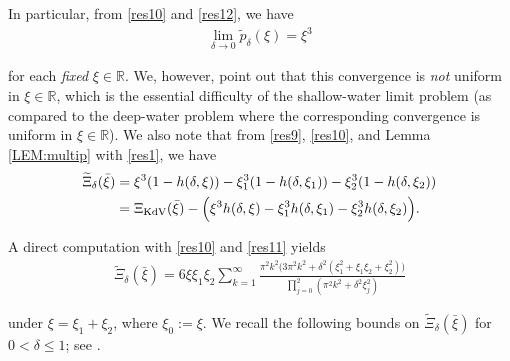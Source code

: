 \documentclass[letterpaper, 11pt,  reqno]{amsart}
\newcommand{\1}{\hspace{0.5mm}\textup{I}\hspace{0.5mm}}
\newcommand{\noi}{\noindent}
\newcommand{\R}{\mathbb{R}}
\newcommand{\dl}{\delta}
\newcommand{\wt}{\widetilde}
\newcommand{\KDV}{\text{\rm KdV} }
\numberwithin{equation}{section}
\numberwithin{theorem}{section}
\begin{document}
In particular, from \eqref{res10} and \eqref{res12}, 
we have
\begin{align}
\lim_{\dl \to 0}
\wt p_\dl(\xi) = \xi^3
\label{res13}
\end{align}

\noi
for each {\it fixed} $\xi \in \R$.
We, however, point out that this convergence
is {\it not} uniform in $\xi \in \R$, 
which is  
the essential difficulty of the shallow-water limit problem
(as compared to the deep-water problem
where the corresponding convergence is uniform in $\xi \in \R$).
We also note that 
from \eqref{res9}, \eqref{res10}, and Lemma \ref{LEM:multip}
with \eqref{res1}, we have
\begin{align}
\begin{split}
\wt \Xi_\dl (\bar \xi)
&
=
 \xi^3 ( 1 - h(\dl, \xi)) - \xi_1^3 (1 - h(\dl,\xi_1)) - \xi_2^3 (1 - h(\dl, \xi_2))
\\
&
= \Xi_\KDV(\bar \xi) - 
\Big( \xi^3 h(\dl,\xi) - \xi_1^3 h(\dl, \xi_1) - \xi_2^3 h(\dl, \xi_2) \Big).
\end{split}
\label{Xi1}
\end{align}









A direct computation  with \eqref{res10} and \eqref{res11}
yields
\begin{align}
\wt \Xi_\dl(\bar \xi)
= 6\xi \xi_1 \xi_2
 \sum_{k=1}^{\infty}   
 \frac{ \pi^2 k^2 \big(3 \pi^2 k^2 + \dl^2(\xi_1^2 + \xi_1 \xi_2 + \xi_2^2)\big)}
 {\prod_{j = 0}^2(\pi^2 k^2 +\dl^2\xi_j^2)}
\label{LL1}
\end{align}

\noi
under  $\xi = \xi_1 + \xi_2$, where $\xi_0 := \xi$.
We recall the following bounds on 
$\wt \Xi_\dl(\bar \xi)$ for $0 < \dl \le 1$;
see \cite[Subsection~5.4]{CGLLO}.
\end{document}
